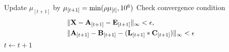 \begin{algorithm}[t]
{\begin{algorithmic}[1]
\begin{equation}
                \end{equation}
            \STATE{} Update $\mu_{[t+1]}$ by $\mu_{[t+1]} = \min(\rho {\mu_{[t]}}, 10^6)$
            \STATE{} Check convergence condition
                \begin{equation}\label{eq:convergence_condition}
                    \begin{aligned}
                        &\lVert {\boldsymbol{\mathbf{X}}} - \boldsymbol{\mathbf{A}}_{[t+1]} - \boldsymbol{\mathbf{E}}_{[t+1]} \rVert_{\infty} < \epsilon, \\
                        &\lVert \boldsymbol{\mathbf{A}}_{[t+1]} - \boldsymbol{\mathbf{B}}_{[t+1]} - (\boldsymbol{\mathbf{L}}_{[t+1]} \ast \boldsymbol{\mathbf{C}}_{[t+1]}) \rVert_{\infty} < \epsilon
                    \end{aligned}
                \end{equation}
            \STATE{} $t \leftarrow t + 1$
        \ENDWHILE{}
    \end{algorithmic}
}
\end{algorithm}
